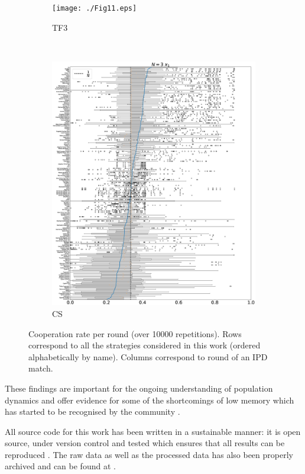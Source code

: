 \documentclass[10pt,letterpaper]{article}
\begin{document}
\begin{figure}[!hbtp]
    \begin{subfigure}[t]{.5\columnwidth}
        \centering
        \texttt{[image: ./Fig11.eps]}
        \caption{TF3}
    \end{subfigure}%
    ~
    \begin{subfigure}[t]{.5\columnwidth}
        \centering
        \includegraphics[draft, width=\columnwidth]{./Fig12.eps}
        \caption{CS}
    \end{subfigure}
    \caption{Cooperation rate per round (over 10000 repetitions). Rows
        correspond to all the strategies considered in this work (ordered
    alphabetically by name). Columns correspond to round of an IPD match.}
    \label{fig:cooperation_rates}
\end{figure}

These findings are important for the ongoing understanding of
population dynamics and offer evidence for some of the shortcomings of low
memory which has started to be recognised by the community \cite{Hilbe2017}.

All source code for this work has been written in a sustainable manner: it is
open source, under version control and tested which ensures that all results can
be reproduced \cite{Prlic2012, Sandve2013, Wilson2014}. The raw data as well as
the processed data has also been properly archived and can be found
at \cite{data}.
\end{document}
